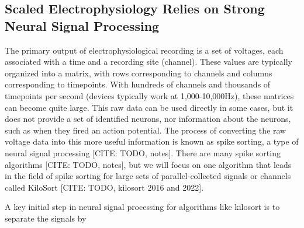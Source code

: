 \documentclass[11pt]{article}
\newcommand{\subsectionwithindent}[1]{
    \subsection*{#1}
    \hspace{\parindent} %
}
\begin{document}



\subsectionwithindent{Scaled Electrophysiology Relies on Strong Neural Signal Processing} %
The primary output of electrophysiological recording is a set of voltages, each associated with a time and a recording site (channel). These values are typically organized into a matrix, with rows corresponding to channels and columns corresponding to timepoints. With hundreds of channels and thousands of timepoints per second (devices typically work at 1,000-10,000Hz), these matrices can become quite large. This raw data can be used directly in some cases, but it does not provide a set of identified neurons, nor information about the neurons, such as when they fired an action potential. The process of converting the raw voltage data into this more useful information is known as spike sorting, a type of neural signal processing [CITE: TODO, notes]. There are many spike sorting algorithms [CITE: TODO, notes], but we will focus on one algorithm that leads in the field of spike sorting for large sets of parallel-collected signals or channels called KiloSort [CITE: TODO, kilosort 2016 and 2022].

A key initial step in neural signal processing for algorithms like kilosort is to separate the signals by

\end{document}

